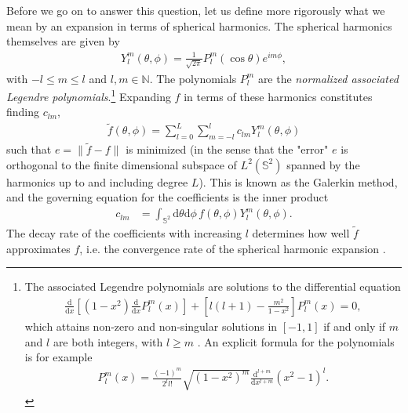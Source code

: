\documentclass[a4paper]{article}
\newcommand{\der} [2]{\frac{\mathrm{d} #1}{\mathrm{d} #2}}   %
\newcommand{\comment}[1]{\ignorespaces}
\begin{document}
Before we go on to answer this question, let us define more rigorously what we mean by an expansion in terms of spherical harmonics. The spherical harmonics themselves are given by \cite{rottmann}
\begin{align}
Y^m_l(\theta,\phi)=\frac{1}{\sqrt{2\pi}}P^m_l(\cos\theta)e^{im\phi},
\end{align}
with $-l\le m \le l$ and $l,m\in\mathbb{N}$. The polynomials $P^m_l$ are the \emph{normalized associated Legendre polynomials}.\footnote{The associated Legendre polynomials are solutions to the differential equation
\begin{align}
\der{}{x}\left[\left(1-x^2\right)\der{}{x}P^m_l(x)\right]+\left[ l(l+1)-\frac{m^2}{1-x^2} \right]P^m_l(x)=0,
\end{align}
which attains non-zero and non-singular solutions in $[-1,1]$ if and only if $m$ and $l$ are both integers, with $l\ge m$ \cite{rottmann}\comment{p92}. An explicit formula for the polynomials is for example 
\begin{align}
P^m_l(x)=\frac{(-1)^m}{2^ll!}\sqrt{\left(1-x^2\right)^m}\der{^{l+m}}{x^{l+m}}\left(x^2-1\right)^l.
\end{align}
} Expanding $f$ in terms of these harmonics constitutes finding $c_{lm}$,
\begin{align}
\tilde f(\theta,\phi)=\sum_{l=0}^L\sum_{m=-l}^lc_{lm}Y^m_l(\theta,\phi) \label{eq:ftilde}
\end{align}
such that $e=\lVert\tilde f - f \rVert$ is minimized \cite{matinf5620} (in the sense that the "error" $e$ is orthogonal to the finite dimensional subspace of $L^2(\mathbb{S}^2)$ spanned by the harmonics up to and including degree $L$). This is known as the Galerkin method, and the governing equation for the coefficients is the inner product 
\begin{align}
c_{lm}&=\int_{\mathbb{S}^2}\mathrm{d}\theta\mathrm{d}\phi\,f(\theta,\phi)Y^m_l(\theta,\phi).\label{eq:dft1}
\end{align}
The decay rate of the coefficients with increasing $l$ determines how well $\tilde f$ approximates $f$, i.e. the convergence rate of the spherical harmonic expansion \cite{beentjes}\comment{p2}.
\end{document}
